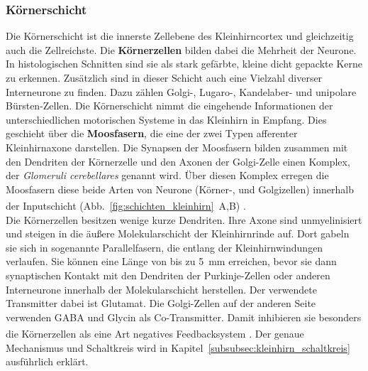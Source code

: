 \documentclass[12pt,a4paper,pdftex]{article}
\begin{document}
\subsubsection*{Körnerschicht} 
Die Körnerschicht ist die innerste Zellebene des Kleinhirncortex und gleichzeitig auch die Zellreichste. Die \textbf{Körnerzellen} bilden dabei die Mehrheit der Neurone. In histologischen Schnitten sind sie als stark gefärbte, kleine dicht gepackte Kerne zu erkennen. Zusätzlich sind in dieser Schicht auch eine Vielzahl diverser Interneurone zu finden. Dazu zählen Golgi-, Lugaro-, Kandelaber- und unipolare Bürsten-Zellen. Die Körnerschicht nimmt die eingehende Informationen der unterschiedlichen motorischen Systeme in das Kleinhirn in Empfang. Dies geschieht über die \textbf{Moosfasern}, die eine der zwei Typen afferenter Kleinhirnaxone darstellen. Die Synapsen der Moosfasern bilden zusammen mit den Dendriten der Körnerzelle und den Axonen der Golgi-Zelle einen Komplex, der \textit{Glomeruli cerebellares} genannt wird. Über diesen Komplex erregen die Moosfasern diese beide Arten von Neurone (Körner-, und Golgizellen) innerhalb der Inputschicht (Abb.~\ref{fig:schichten_kleinhirn}~A,B) \textsuperscript{\cite[42]{kandel2013principles}}.\\
Die Körnerzellen besitzen wenige kurze Dendriten. Ihre Axone sind unmyelinisiert und steigen in die äußere Molekularschicht der Kleinhirnrinde auf. Dort gabeln sie sich in sogenannte Parallelfasern, die entlang der Kleinhirnwindungen verlaufen. Sie können eine Länge von bis zu 5~mm erreichen, bevor sie dann synaptischen Kontakt mit den Dendriten der Purkinje-Zellen oder anderen Interneurone innerhalb der Molekularschicht herstellen. Der verwendete Transmitter dabei ist Glutamat. Die Golgi-Zellen auf der anderen Seite verwenden GABA und Glycin als Co-Transmitter. Damit inhibieren sie besonders die Körnerzellen als eine Art negatives Feedbacksystem \textsuperscript{\cite[9]{paxinos2014rat}}. Der genaue Mechanismus und Schaltkreis wird in Kapitel~\ref{subsubsec:kleinhirn_schaltkreis} ausführlich erklärt. 
\end{document}
